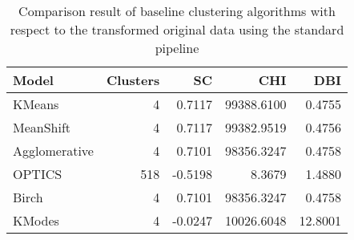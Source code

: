 \begin{table}[t]
\centering
\caption{Comparison result of baseline clustering algorithms with respect to the transformed original data using the standard pipeline}
\label{tbl:Baseline_res}
\begin{tabular}{lrrrr}
\toprule
        Model &  Clusters &      SC &        CHI &     DBI \\
\midrule
       KMeans &         4 &  0.7117 & 99388.6100 &  0.4755 \\
    MeanShift &         4 &  0.7117 & 99382.9519 &  0.4756 \\
Agglomerative &         4 &  0.7101 & 98356.3247 &  0.4758 \\
       OPTICS &       518 & -0.5198 &     8.3679 &  1.4880 \\
        Birch &         4 &  0.7101 & 98356.3247 &  0.4758 \\
       KModes &         4 & -0.0247 & 10026.6048 & 12.8001 \\
\bottomrule
\end{tabular}
\end{table}
